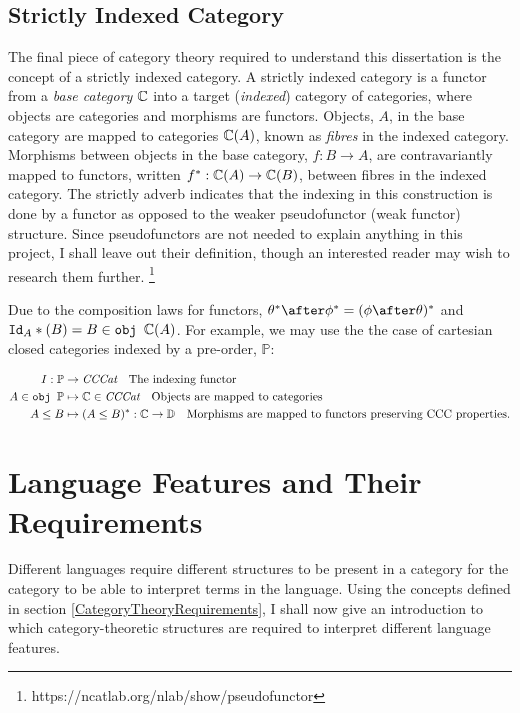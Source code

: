 \documentclass{Report}
\begin{document}
\subsection{Strictly Indexed Category}

The final piece of category theory required to understand this dissertation is the concept of a strictly indexed category. A strictly indexed category is a functor from a \textit{base category} $\mathbb{C}$ into a target (\textit{indexed}) category of categories, where objects are categories and morphisms are functors. Objects, $A$, in the base category are mapped to categories $\mathbb{C}(A)$, known as \textit{fibres} in the indexed category. Morphisms between objects in the base category, $f: B\rightarrow A$, are contravariantly mapped to functors, written $f^*: \mathbb{C}(A)\rightarrow \mathbb{C}(B)$, between fibres in the indexed category. The strictly adverb indicates that the indexing in this construction is done by a functor as opposed to the weaker pseudofunctor (weak functor) structure. Since pseudofunctors are not needed to explain anything in this project, I shall leave out their definition, though an interested reader may wish to research them further. \footnote{https://ncatlab.org/nlab/show/pseudofunctor}


Due to the composition laws for functors, $\theta\star\after\phi\star = (\phi\after\theta)\star$ and $\texttt{Id}_{A}*(B) = B\in\texttt{obj } \mathbb{C}(A)$. For example, we may use the the case of cartesian closed categories indexed by a pre-order, $\mathbb{P}$:

\begin{align}
    I: \mathbb{P} & \rightarrow \textit{CCCat}\quad\text{The indexing functor} \\
    A \in\texttt{obj }\mathbb{P} & \mapsto \mathbb{C} \in\textit{CCCat}\quad\text{Objects are mapped to categories}\\
    A \leq B & \mapsto (A \leq B)^*: \mathbb{C} \rightarrow \mathbb{D}\quad\text{Morphisms are mapped to functors preserving CCC properties.}
\end{align}

\section{Language Features and Their Requirements}\label{LanguageFeatureRequirements}


Different languages require different structures to be present in a category for the category to be able to interpret terms in the language. Using the concepts defined in section \ref{CategoryTheoryRequirements}, I shall now give an introduction to which category-theoretic structures are required to interpret different language features. 
\end{document}
